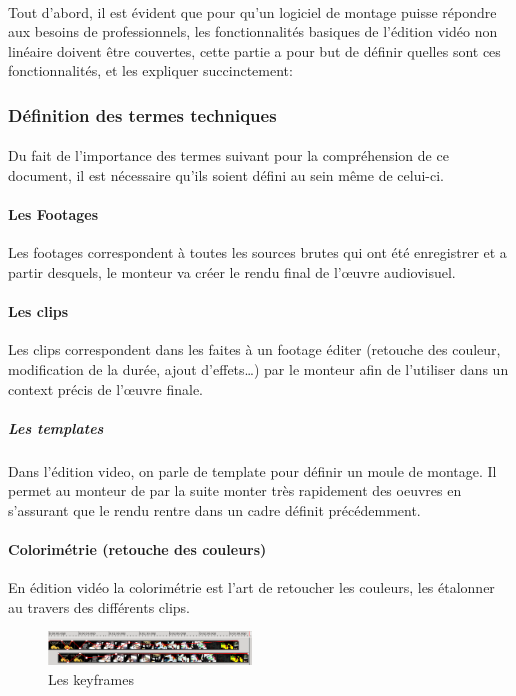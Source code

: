 \paragraph{}
Tout d'abord, il est évident que pour qu'un logiciel de montage puisse répondre
aux besoins de professionnels, les fonctionnalités basiques de l'édition vidéo
non linéaire doivent être couvertes, cette partie a pour but de définir quelles
sont ces fonctionnalités, et les expliquer succinctement:

\subsubsection{Définition des termes techniques}

\paragraph {}
Du fait de l'importance des termes suivant pour la compréhension de ce document,
il est nécessaire qu'ils soient défini au sein même de celui-ci.

\paragraph{Les Footages}
Les footages correspondent à toutes les sources brutes qui ont été enregistrer
et a partir desquels, le monteur va créer le rendu final de l'œuvre 
audiovisuel.

\paragraph{Les clips}
Les clips correspondent dans les faites à un footage éditer (retouche des
couleur, modification de la durée, ajout d'effets\ldots) par le monteur
afin de l'utiliser dans un context précis de l'œuvre finale.

\subparagraph{Les templates}
Dans l'édition video, on parle de template pour définir un moule de montage.
Il permet au monteur de par la suite monter très rapidement des oeuvres en
s'assurant que le rendu rentre dans un cadre définit précédemment.

\paragraph{Colorimétrie (retouche des couleurs)}
En édition vidéo la colorimétrie est l'art de retoucher les couleurs,
les étalonner au travers des différents clips.

\begin{figure}
   \vspace{-20pt}
    \begin{center}
      \includegraphics[width=0.48\textwidth]{images/keyframecurves}
    \end{center}
   \vspace{-30pt}
   \caption{Les keyframes}
   \vspace{-10pt}
   \label{Yes}
\end{figure}
